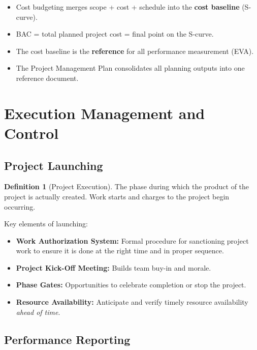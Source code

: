 \documentclass[11pt,a4paper]{article}
\theoremstyle{definition}
\newtheorem{definition}{Definition}[section]
\theoremstyle{plain}
\begin{document}
\begin{keytakeaways}
\begin{itemize}[nosep]
  \item Cost budgeting merges scope + cost + schedule into the \textbf{cost baseline} (S-curve).
  \item BAC = total planned project cost = final point on the S-curve.
  \item The cost baseline is the \textbf{reference} for all performance measurement (EVA).
  \item The Project Management Plan consolidates all planning outputs into one reference document.
\end{itemize}
\end{keytakeaways}


\section{Execution Management and Control}

\subsection{Project Launching}

\begin{definition}[Project Execution]
The phase during which the product of the project is actually created. Work starts and charges to the project begin occurring.
\end{definition}

Key elements of launching:
\begin{itemize}[nosep]
  \item \textbf{Work Authorization System:} Formal procedure for sanctioning project work to ensure it is done at the right time and in proper sequence.
  \item \textbf{Project Kick-Off Meeting:} Builds team buy-in and morale.
  \item \textbf{Phase Gates:} Opportunities to celebrate completion or stop the project.
  \item \textbf{Resource Availability:} Anticipate and verify timely resource availability \emph{ahead of time}.
\end{itemize}

\subsection{Performance Reporting}
\end{document}
